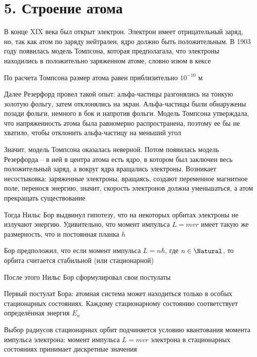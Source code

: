 \documentclass[12pt]{article}
\begin{document}
\section{5. Строение атома}

В конце XIX века был открыт электрон. Электрон имеет отрицательный заряд, но, так как атом по заряду нейтрален, ядро должно быть положительным. В 1903 году появилась модель Томпсона, которая предполагала, что электроны находились в положительно заряженном атоме, словно изюм в кексе 

По расчета Томпсона размер атома равен приблизительно $10^{-10}$ м

Далее Резерфорд провел такой опыт: альфа-частицы разгонялись на тонкую золотую фольгу, затем отклонялись на экран. Альфа-частицы были обнаружены позади фольги, немного в бок и напротив фольги. Модель Томпсона утверждала, что напряженность атома была равномерно распространена, поэтому ее бы не хватило, чтобы отклонить альфа-частицу на меньший угол

Значит, модель Томпсона оказалась неверной. Потом появилась модель Резерфорда -- в ней в центра атома есть ядро, в котором был заключен весь положительный заряд, а вокруг ядра вращались электроны. Возникает несостыковка: заряженные электроны, вращаясь, создают переменное магнитное поле, перенося энергию, значит, скорость электронов должна уменьшаться, а атом прекращать существование

Тогда Нильс Бор выдвинул гипотезу, что на некоторых орбитах электроны не излучают энергию. Удивительно, что момент импульса $L = m v r$ имеет такую же размерность, что и постоянная планка $h$

Бор предположил, что если момент импульса $L = n \hbar$, где $n \in \Natural$, то орбита считается стабильной (или стационарной)






После этого Нильс Бор сформулировал свои постулаты

Первый постулат Бора: атомная система может находиться только в особых стационарных состояниях. Каждому стационарному состоянию соответствует определённая энергия $E_n$

Выбор радиусов стационарных орбит подчиняется условию квантования момента импульса электрона: момент импульса $L = m v r$ электрона в стационарных состояниях принимает дискретные значения
\end{document}
